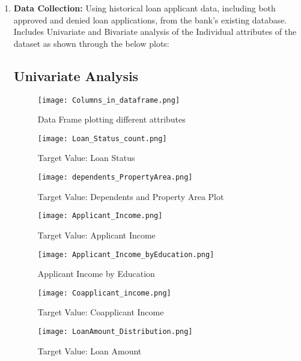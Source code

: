 \documentclass[10pt]{article}
\begin{document}
\begin{enumerate}
    \item \textbf{Data Collection:} Using historical loan applicant data, including both approved and denied loan applications, from the bank's existing database.\\
    Includes Univariate and Bivariate analysis of the Individual attributes of the dataset as shown through the below plots:

    \subsection*{Univariate Analysis}
\begin{figure}[H]
\begin{center}
        \texttt{[image: Columns\_in\_dataframe.png]}
        \caption{Data Frame plotting different attributes}
        \label{fig:sub1}
\end{center}
\end{figure}
\begin{figure}[H]
\begin{center}
        \texttt{[image: Loan\_Status\_count.png]}
        \caption{Target Value: Loan Status}
        \label{fig:sub1}
\end{center}
\end{figure}
\begin{figure}[H]
\begin{center}
        \texttt{[image: dependents\_PropertyArea.png]}
        \caption{Target Value: Dependents and Property Area Plot}
        \label{fig:sub1}
\end{center}
\end{figure}
\begin{figure}[H]
\begin{center}
        \texttt{[image: Applicant\_Income.png]}
        \caption{Target Value: Applicant Income}
        \label{fig:sub1}
\end{center}
\end{figure}
\begin{figure}[H]
\begin{center}
        \texttt{[image: Applicant\_Income\_byEducation.png]}
        \caption{Applicant Income by Education}
        \label{fig:sub1}
\end{center}
\end{figure}
\begin{figure}[H]
\begin{center}
        \texttt{[image: Coapplicant\_income.png]}
        \caption{Target Value: Coapplicant Income}
        \label{fig:sub1}
\end{center}
\end{figure}
\begin{figure}[H]
\begin{center}
        \texttt{[image: LoanAmount\_Distribution.png]}
        \caption{Target Value: Loan Amount}
        \label{fig:sub1}
\end{center}
\end{figure}


\end{enumerate}
\end{document}
